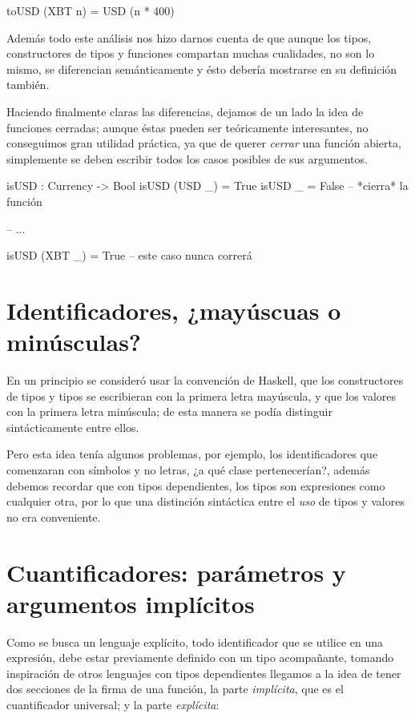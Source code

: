 {\begin{designfr}
\begin{anglercode}
toUSD (XBT n) = USD (n * 400)
\end{anglercode}

Además todo este análisis nos hizo darnos cuenta de que aunque los tipos, constructores de tipos y funciones compartan muchas cualidades, no son lo mismo, se diferencian semánticamente y ésto debería mostrarse en su definición también.

Haciendo finalmente claras las diferencias, dejamos de un lado la idea de funciones cerradas; aunque éstas pueden ser teóricamente interesantes, no conseguimos gran utilidad práctica, ya que de querer \textit{cerrar} una función abierta, simplemente se deben escribir todos los casos posibles de sus argumentos.

\begin{anglercode}
isUSD : Currency -> Bool
isUSD (USD _) = True
isUSD _ = False         -- *cierra* la función

-- ...

isUSD (XBT _) = True    -- este caso nunca correrá
\end{anglercode}
\end{designfr}

\section{Identificadores, ¿mayúscuas o minúsculas?}

\begin{designfr}
En un principio se consideró usar la convención de Haskell, que los constructores de tipos y tipos se escribieran con la primera letra mayúscula, y que los valores con la primera letra minúscula; de esta manera se podía distinguir sintácticamente entre ellos.

Pero esta idea tenía algunos problemas, por ejemplo, los identificadores que comenzaran con símbolos y no letras, ¿a qué clase pertenecerían?, además debemos recordar que con tipos dependientes, los tipos son expresiones como cualquier otra, por lo que una distinción sintáctica entre el \emph{uso} de tipos y valores no era conveniente.
\end{designfr}

\section{Cuantificadores: parámetros y argumentos implícitos}

\begin{designfr}
Como se busca un lenguaje explícito, todo identificador que se utilice en una expresión, debe estar previamente definido con un tipo acompañante, tomando inspiración de otros lenguajes con tipos dependientes llegamos a la idea de tener dos secciones de la firma de una función, la parte \emph{implícita}, que es el cuantificador universal; y la parte \emph{explícita}:


\end{designfr}}
